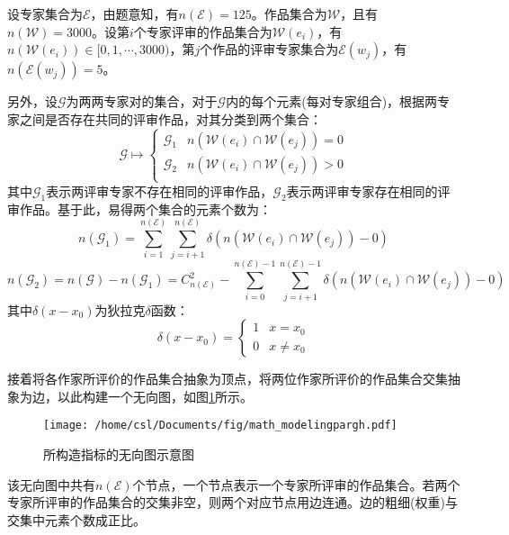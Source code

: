 \documentclass[bwprint]{gmcmthesis}
\begin{document}
	设专家集合为$\mathcal{E}$，由题意知，有$n(\mathcal{E})=125$。作品集合为$\mathcal{W}$，且有$n(\mathcal{W})=3000$。设第$i$个专家评审的作品集合为$\mathcal{W}(e_i)$，有$n(\mathcal{W}(e_i))\in[0,1,\cdots,3000)$，第$j$个作品的评审专家集合为$\mathcal{E}(w_j)$，有$n(\mathcal{E}(w_j))=5$。
	
	另外，设$\mathcal{G}$为两两专家对的集合，对于$\mathcal{G}$内的每个元素(每对专家组合)，根据两专家之间是否存在共同的评审作品，对其分类到两个集合：
	\begin{equation}
		\mathcal{G}\mapsto\begin{cases}
			\mathcal{G}_1&n\left(\mathcal{W}(e_i)\cap\mathcal{W}(e_j) \right)=0\\
			\mathcal{G}_2&n\left(\mathcal{W}(e_i)\cap\mathcal{W}(e_j) \right)> 0\\
		\end{cases}
	\end{equation}
	其中$\mathcal{G}_1$表示两评审专家不存在相同的评审作品，$\mathcal{G}_2$表示两评审专家存在相同的评审作品。基于此，易得两个集合的元素个数为：
	\begin{equation}
		n(\mathcal{G}_1)=\sum_{i=1}^{n(\mathcal{E})}\sum_{j=i+1}^{n(\mathcal{E})}
		\delta(n\left(\mathcal{W}(e_i)\cap\mathcal{W}(e_j) \right)-0)
	\end{equation}
	\begin{equation}
		n(\mathcal{G}_2)=
		n(\mathcal{G})-n(\mathcal{G}_1)=
		C_{n(\mathcal{E})}^{2}-\sum_{i=0}^{n(\mathcal{E})-1}\sum_{j=i+1}^{n(\mathcal{E})-1}
		\delta(n\left(\mathcal{W}(e_i)\cap\mathcal{W}(e_j) \right)-0)
	\end{equation}
	其中$\delta(x-x_0)$为狄拉克$\delta$函数\cite{闵琦2004delta}：
	\begin{equation}
		\delta(x-x_0)=\begin{cases}
			1&x=x_0\\0&x\ne x_0
		\end{cases}
	\end{equation}
	\par
	
	接着将各作家所评价的作品集合抽象为顶点，将两位作家所评价的作品集合交集抽象为边，以此构建一个无向图\cite{bloom1977applications}，如图\ref{fig:所构造指标的无向图示意图}所示。
	\begin{figure}[t]
		\centering
		\texttt{[image: /home/csl/Documents/fig/math\_modelingpargh.pdf]}
		\caption{\normf 所构造指标的无向图示意图}
		\label{fig:所构造指标的无向图示意图}
	\end{figure}
	该无向图中共有$n(\mathcal{E})$个节点，一个节点表示一个专家所评审的作品集合。若两个专家所评审的作品集合的交集非空，则两个对应节点用边连通。边的粗细(权重)与交集中元素个数成正比。
	
\end{document}
